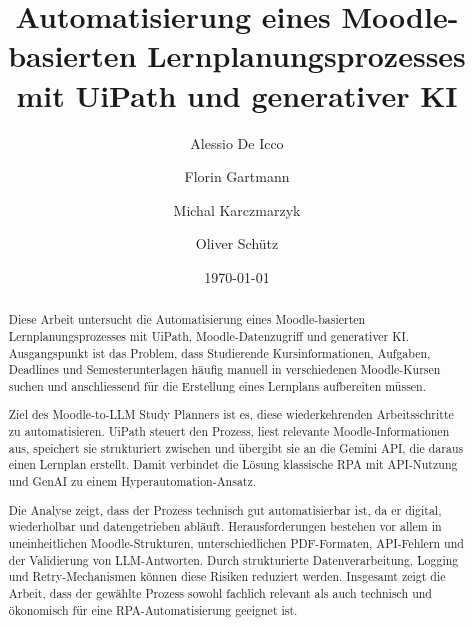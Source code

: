 

\titlehead{BSc Computational and Data Science\\CDS-309 Hyperautomation und RPA\\Dozenten: Markus Müntener, Matthias Müller\hfill}
\title{Automatisierung eines Moodle-basierten Lernplanungsprozesses mit UiPath und generativer KI}
\author[1,*]{Alessio De Icco}
\author[2,*]{Florin Gartmann}
\author[3,*]{Michal Karczmarzyk}
\author[4,*]{Oliver Schütz}
\date{\today}
\maketitle

\begin{abstract}
Diese Arbeit untersucht die Automatisierung eines Moodle-basierten Lernplanungsprozesses mit UiPath, Moodle-Datenzugriff und generativer KI. Ausgangspunkt ist das Problem, dass Studierende Kursinformationen, Aufgaben, Deadlines und Semesterunterlagen häufig manuell in verschiedenen Moodle-Kursen suchen und anschliessend für die Erstellung eines Lernplans aufbereiten müssen.

Ziel des Moodle-to-LLM Study Planners ist es, diese wiederkehrenden Arbeitsschritte zu automatisieren. UiPath steuert den Prozess, liest relevante Moodle-Informationen aus, speichert sie strukturiert zwischen und übergibt sie an die Gemini API, die daraus einen Lernplan erstellt. Damit verbindet die Lösung klassische RPA mit API-Nutzung und GenAI zu einem Hyperautomation-Ansatz.

Die Analyse zeigt, dass der Prozess technisch gut automatisierbar ist, da er digital, wiederholbar und datengetrieben abläuft. Herausforderungen bestehen vor allem in uneinheitlichen Moodle-Strukturen, unterschiedlichen PDF-Formaten, API-Fehlern und der Validierung von LLM-Antworten. Durch strukturierte Datenverarbeitung, Logging und Retry-Mechanismen können diese Risiken reduziert werden. Insgesamt zeigt die Arbeit, dass der gewählte Prozess sowohl fachlich relevant als auch technisch und ökonomisch für eine RPA-Automatisierung geeignet ist.
\end{abstract}

\clearpage